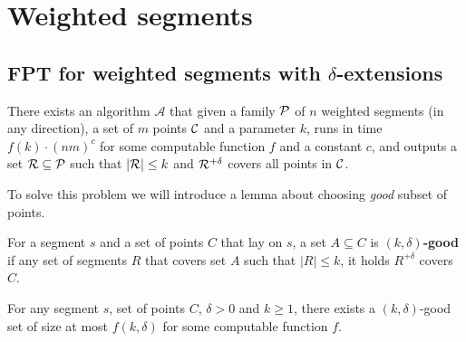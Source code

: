 \section{Weighted segments}
\subsection{FPT for weighted segments with $\delta$-extensions}
\begin{tw}{
	\label{fpt_weighted_segment}
	There exists an algorithm $\mathcal{A}$ that given a family $\mathcal{P}$ of
	$n$ weighted segments (in any direction),
	a set of $m$ points $\mathcal{C}$
	and a parameter $k$,
	runs in time $f(k) \cdot (nm)^c$ for some computable function $f$ and a constant $c$,
	and outputs a set $\mathcal{R} \subseteq \mathcal{P}$
	such that $|\mathcal{R}| \le k$ and $\mathcal{R}^{+\delta}$ covers all points in $\mathcal{C}$.
}\end{tw}


To solve this problem we will introduce a lemma about choosing
\textit{good} subset of points.

\begin{defi}
	For a segment $s$ and a set
	of points $C$ that lay on $s$,
	a set $A \subseteq C$ is \textbf{$(k,\delta)$-good} 
	if any set of segments $R$ that covers set $A$
	such that $|R| \le k$, it holds $R^{+\delta}$ covers $C$.
\end{defi}

\begin{lemma}
	\label{good_set_exists}
	For any segment $s$, set of points $C$, $\delta > 0$ and $k \ge 1$,
	there exists a $(k,\delta)$-good set of size at most $f(k, \delta)$
	for some computable function $f$.
\end{lemma}

